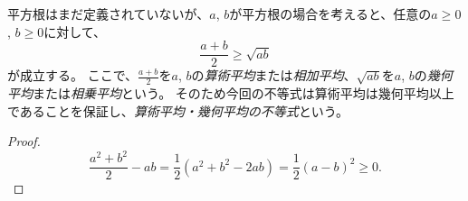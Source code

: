 \begin{remark}
平方根はまだ定義されていないが、$a$, $b$が平方根の場合を考えると、任意の$a \ge 0$, $b \ge 0$に対して、
$$
\frac{a+b}{2} \ge \sqrt{a b}
$$
が成立する。
ここで、$\frac{a+b}{2}$を$a$, $b$の\emph{算術平均}または\emph{相加平均}、$\sqrt{a b}$を$a$, $b$の\emph{幾何平均}または\emph{相乗平均}という。
そのため今回の不等式は算術平均は幾何平均以上であることを保証し、\emph{算術平均・幾何平均の不等式}という。
\end{remark}

\begin{proof}
$$
\frac{a^2+b^2}{2}-a b
= \frac{1}{2}(a^2+b^2-2 a b)
= \frac{1}{2}(a-b)^2 \ge 0.
$$
\end{proof}
